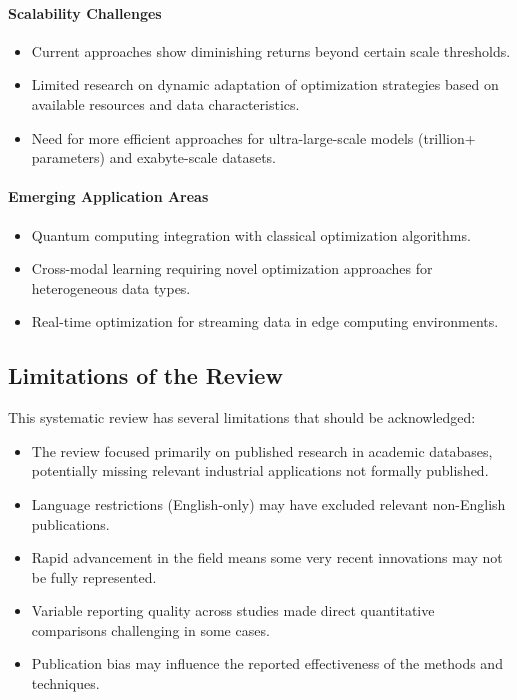 \paragraph{Scalability Challenges}
\begin{itemize}
    \item Current approaches show diminishing returns beyond certain scale thresholds.
    
    \item Limited research on dynamic adaptation of optimization strategies based on available resources and data characteristics.
    
    \item Need for more efficient approaches for ultra-large-scale models (trillion+ parameters) and exabyte-scale datasets.
\end{itemize}

\paragraph{Emerging Application Areas}
\begin{itemize}
    \item Quantum computing integration with classical optimization algorithms.
    
    \item Cross-modal learning requiring novel optimization approaches for heterogeneous data types.
    
    \item Real-time optimization for streaming data in edge computing environments.
\end{itemize}

\subsection{Limitations of the Review}
This systematic review has several limitations that should be acknowledged:

\begin{itemize}
    \item The review focused primarily on published research in academic databases, potentially missing relevant industrial applications not formally published.
    
    \item Language restrictions (English-only) may have excluded relevant non-English publications.
    
    \item Rapid advancement in the field means some very recent innovations may not be fully represented.
    
    \item Variable reporting quality across studies made direct quantitative comparisons challenging in some cases.
    
    \item Publication bias may influence the reported effectiveness of the methods and techniques.
\end{itemize}

